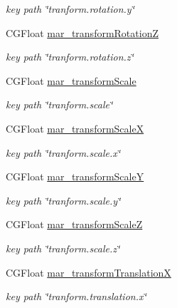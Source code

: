 \begin{DoxyCompactItemize}
\begin{DoxyCompactList}\small\item\em key path \char`\"{}tranform.\+rotation.\+y\char`\"{} \end{DoxyCompactList}\item 
C\+G\+Float \hyperlink{category_c_a_layer_07_m_a_r_e_x_08_ae42adc013b632097edfa32f6525bcbc0}{mar\+\_\+transform\+RotationZ}
\begin{DoxyCompactList}\small\item\em key path \char`\"{}tranform.\+rotation.\+z\char`\"{} \end{DoxyCompactList}\item 
C\+G\+Float \hyperlink{category_c_a_layer_07_m_a_r_e_x_08_ae526797f3f27777e381e12e13ba45c01}{mar\+\_\+transform\+Scale}
\begin{DoxyCompactList}\small\item\em key path \char`\"{}tranform.\+scale\char`\"{} \end{DoxyCompactList}\item 
C\+G\+Float \hyperlink{category_c_a_layer_07_m_a_r_e_x_08_a025b1a9e2a200f38ba391ae998189a95}{mar\+\_\+transform\+ScaleX}
\begin{DoxyCompactList}\small\item\em key path \char`\"{}tranform.\+scale.\+x\char`\"{} \end{DoxyCompactList}\item 
C\+G\+Float \hyperlink{category_c_a_layer_07_m_a_r_e_x_08_a016cb9172f4f7f09703457540343b230}{mar\+\_\+transform\+ScaleY}
\begin{DoxyCompactList}\small\item\em key path \char`\"{}tranform.\+scale.\+y\char`\"{} \end{DoxyCompactList}\item 
C\+G\+Float \hyperlink{category_c_a_layer_07_m_a_r_e_x_08_af4eddd272b733db85cbffe1c8d470187}{mar\+\_\+transform\+ScaleZ}
\begin{DoxyCompactList}\small\item\em key path \char`\"{}tranform.\+scale.\+z\char`\"{} \end{DoxyCompactList}\item 
C\+G\+Float \hyperlink{category_c_a_layer_07_m_a_r_e_x_08_a59105aea49e91d1c3eec79b433fd04f1}{mar\+\_\+transform\+TranslationX}
\begin{DoxyCompactList}\small\item\em key path \char`\"{}tranform.\+translation.\+x\char`\"{} \end{DoxyCompactList}\item 

\end{DoxyCompactItemize}
